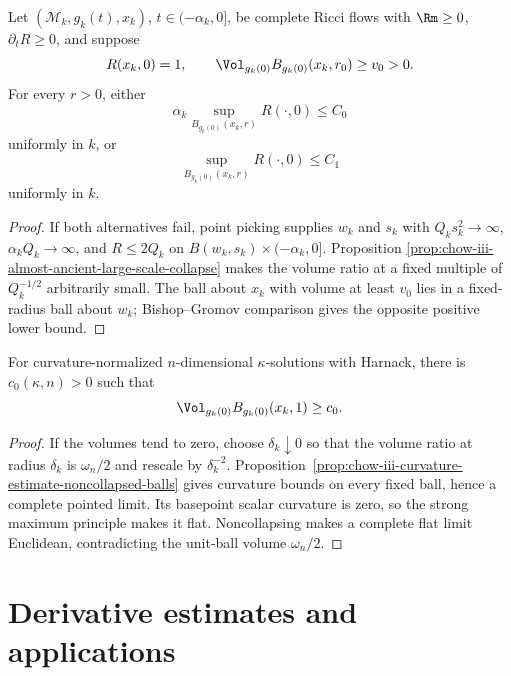 \begin{lemma}
\label{lem:chow-iii-bounded-curvature-bounded-distance}
Let $(\mathcal M_k,g_k(t),x_k)$, $t\in(-\alpha_k,0]$, be complete Ricci
flows with $\Rm\ge0$, $\partial_tR\ge0$, and suppose
\[
 R(x_k,0)=1,
 \qquad \Vol_{g_k(0)}B_{g_k(0)}(x_k,r_0)\ge v_0>0.
\]
For every $r>0$, either
\[
 \alpha_k\sup_{B_{g_k(0)}(x_k,r)}R(\cdot,0)\le C_0
\]
uniformly in $k$, or
\[
 \sup_{B_{g_k(0)}(x_k,r)}R(\cdot,0)\le C_1
\]
uniformly in $k$.
\end{lemma}
\begin{proof}
\sketch If both alternatives fail, point picking supplies $w_k$ and $s_k$ with
$Q_ks_k^2\to\infty$, $\alpha_kQ_k\to\infty$, and $R\le2Q_k$ on
$B(w_k,s_k)\times(-\alpha_k,0]$.  Proposition
\ref{prop:chow-iii-almost-ancient-large-scale-collapse} makes the volume
ratio at a fixed multiple of $Q_k^{-1/2}$ arbitrarily small.  The ball about
$x_k$ with volume at least $v_0$ lies in a fixed-radius ball about $w_k$;
Bishop--Gromov comparison gives the opposite positive lower bound.
\end{proof}

\begin{claim}
\label{clm:chow-iii-unit-ball-volume-lower-bound}
For curvature-normalized $n$-dimensional $\kappa$-solutions with Harnack,
there is $c_0(\kappa,n)>0$ such that
\[
 \Vol_{g_k(0)}B_{g_k(0)}(x_k,1)\ge c_0.
\]
\end{claim}
\begin{proof}
\sketch If the volumes tend to zero, choose $\delta_k\downarrow0$ so that the volume
ratio at radius $\delta_k$ is $\omega_n/2$ and rescale by $\delta_k^{-2}$.
Proposition~\ref{prop:chow-iii-curvature-estimate-noncollapsed-balls} gives
curvature bounds on every fixed ball, hence a complete pointed limit.  Its
basepoint scalar curvature is zero, so the strong maximum principle makes it
flat.  Noncollapsing makes a complete flat limit Euclidean, contradicting
the unit-ball volume $\omega_n/2$.
\end{proof}

\section{Derivative estimates and applications}

